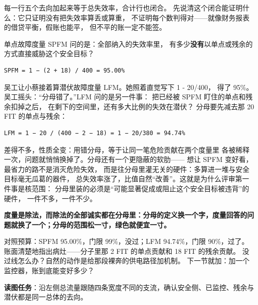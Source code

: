 每一行五个去向加起来等于总失效率，合计行也闭合。
先说清这个闭合能证明什么：它只证明没有把失效率算丢或算重，
不证明每个数判得对——就像财务报表的借贷平衡，假账也能平，
但不平的账一定不能签。

单点故障度量 SPFM 问的是：全部纳入的失效率里，
有多少\textbf{没有}以单点或残余的方式直接威胁这个安全目标？

\nopagebreak[4]
\begin{codebox}
\begin{Verbatim}[fontsize=\small,breaklines=true,breakanywhere=true,breaksymbolleft={},breaksymbolright={}]
SPFM = 1 − (2 + 18) / 400 = 95.00%
\end{Verbatim}
\end{codebox}

吴工让小蔡接着算潜伏故障度量 LFM。她照着直觉写下 1 - 20/400，
得了 95\%。吴工摇头：“分母错了。”LFM 问的是另一件事：
把已经被 SPFM 盯住的单点和残余扣掉之后，
在剩下的空间里，还有多大比例的失效在潜伏？
分母要先减去那 20 FIT 的单点与残余：

\nopagebreak[4]
\begin{codebox}
\begin{Verbatim}[fontsize=\small,breaklines=true,breakanywhere=true,breaksymbolleft={},breaksymbolright={}]
LFM = 1 − 20 / (400 − 2 − 18) = 1 − 20/380 = 94.74%
\end{Verbatim}
\end{codebox}

差得不多，性质全变：用错分母，等于让同一笔危险贡献在两个度量里
各被稀释一次，问题就悄悄换掉了。分母还有一个更隐蔽的软肋——
想让 SPFM 变好看，最省力的路不是消灭危险失效，
而是往分母里灌无关的硬件：多算进一堆与安全目标毫无瓜葛的器件，
总失效率涨了，比值自然“改善”。这就是为什么评审第一件事是核范围：
分母里装的必须是“可能显著促成或阻止这个安全目标被违背”的硬件，
一件不多，一件不少。

\textbf{度量是除法，而除法的全部诚实都在分母里：分母的定义换一个字，度量回答的问题就换了一个；分母的范围松一寸，绿色就便宜一寸。}

对照预算：SPFM 95.00\%，门限 99\%，没过；LFM 94.74\%，门限 90\%，过了。
账面清楚地指出病灶——分子里那 2 FIT 的单点贡献和 18 FIT 的残余贡献。
没过线怎么办？自然的动作是给那段裸奔的供电路径加机制。
下一节就加：加一个监控器，账到底能变好多少？


\begin{noteblock}
\textbf{读图任务}：沿左侧总流量跟随四条宽度不同的支流，确认安全侧、已监控、残余与潜伏都是同一总体的去向。
\end{noteblock}

